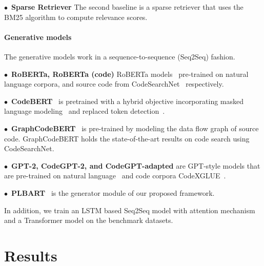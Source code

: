 \documentclass[11pt]{article}
\begin{document}
\noindent$\bullet$~\textbf{Sparse Retriever\hspace{0.5em}}
The second baseline is a sparse retriever that uses the BM25 algorithm to compute relevance scores.






\vspace{-1mm}
\paragraph{Generative models}
The generative models work in a sequence-to-sequence (Seq2Seq) fashion.



\noindent$\bullet$~\textbf{RoBERTa, RoBERTa (code)\hspace{0.5em}} 
RoBERTa  models~\cite{liu2019roberta} pre-trained on natural language corpora, and source code from CodeSearchNet~\cite{husain2019codesearchnet} respectively.


\noindent$\bullet$~{\textbf{CodeBERT}~\cite{feng2020codebert} \hspace{0.5em}} 
is pretrained with a hybrid objective incorporating masked language modeling~\cite{devlin2018bert} and replaced token detection~\cite{clark2020electra}. 

\noindent$\bullet$~{\textbf{GraphCodeBERT}~\cite{guo2020graphcodebert} \hspace{0.5em}} is pre-trained by modeling the data flow graph of source code. GraphCodeBERT holds the state-of-the-art results on code search using CodeSearchNet.




\noindent$\bullet$~\textbf{GPT-2, CodeGPT-2, and CodeGPT-adapted \hspace{0.5em}}
are GPT-style models that are pre-trained on natural language~\cite{radford2019language} and code corpora CodeXGLUE~\cite{CodeXGLUE}.


\noindent$\bullet$~{\textbf{PLBART}~\cite{ahmad2021unified}\hspace{0.5em}} is the generator module of our proposed framework.




In addition, we train an LSTM based Seq2Seq model with attention mechanism~\cite{luong-etal-2015-effective} and a Transformer model \cite{vaswani2017attention} on the benchmark datasets. 






 \section{Results}
\end{document}
